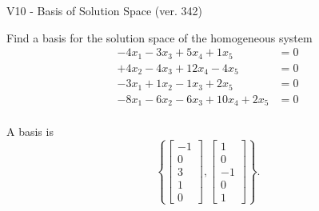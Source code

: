 \begin{exercise}
  \begin{exerciseTitle}V10 - Basis of Solution Space (ver. 342)\end{exerciseTitle}
  \begin{exerciseStatement}
    Find a basis for the solution space of the homogeneous system 
\begin{align*}
 -4 x_ 1 -3 x_ 3 + 5 x_ 4 + 1 x_ 5 &= 0  \\ 
  + 4 x_ 2 -4 x_ 3 + 12 x_ 4 -4 x_ 5 &= 0  \\ 
  -3 x_ 1 + 1 x_ 2 -1 x_ 3 + 2 x_ 5 &= 0  \\ 
  -8 x_ 1 -6 x_ 2 -6 x_ 3 + 10 x_ 4 + 2 x_ 5 &= 0  \\ 
 \end{align*}


 
  \end{exerciseStatement}

  \begin{exerciseAnswer}
   A basis is   
\[\left\{\left[\begin{array}{c}
-1 \\
0 \\
3 \\
1 \\
0
\end{array}\right] , \left[\begin{array}{c}
1 \\
0 \\
-1 \\
0 \\
1
\end{array}\right]\right\}.\]

  


  \end{exerciseAnswer}
\end{exercise}
